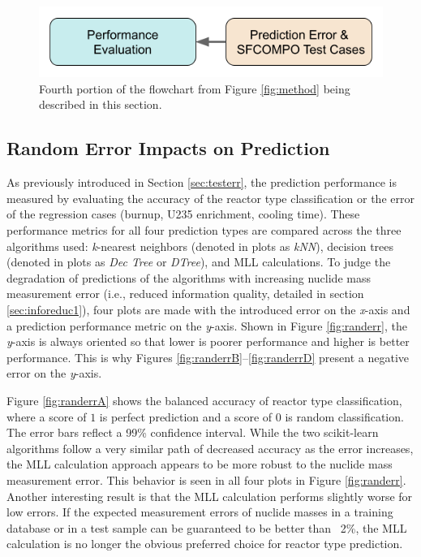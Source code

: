 
\begin{figure}[H]
  \centering
  \includegraphics[width=0.7\linewidth]{./chapters/exp1/methodology4.png}
  \caption{Fourth portion of the flowchart from Figure \ref{fig:method} being 
           described in this section.}
\end{figure}

\subsection{Random Error Impacts on Prediction}
\label{sec:randerr}
As previously introduced in Section \ref{sec:testerr}, the prediction
performance is measured by evaluating the accuracy of the reactor type
classification or the error of the regression cases (burnup, \gls{U235}
enrichment, cooling time).  These performance metrics for all four prediction
types are compared across the three algorithms used: \textit{k}-nearest
neighbors (denoted in plots as \textit{kNN}), decision trees (denoted in plots
as \textit{Dec Tree} or \textit{DTree}), and \gls{MLL} calculations.  To judge
the degradation of predictions of the algorithms with increasing nuclide mass
measurement error (i.e., reduced information quality, detailed in section
\ref{sec:inforeduc1}), four plots are made with the introduced error on the
\textit{x}-axis and a prediction performance metric on the \textit{y}-axis.
Shown in Figure \ref{fig:randerr}, the \textit{y}-axis is always oriented so
that lower is poorer performance and higher is better performance. This is why
Figures \ref{fig:randerrB}--\ref{fig:randerrD} present a negative error on the
\textit{y}-axis.

Figure \ref{fig:randerrA} shows the balanced accuracy of reactor type
classification, where a score of $1$ is perfect prediction and a score of $0$
is random classification. The error bars reflect a 99\% confidence interval.
While the two scikit-learn algorithms follow a very similar path of decreased
accuracy as the error increases, the \gls{MLL} calculation approach appears to
be more robust to the nuclide mass measurement error. This behavior is seen in
all four plots in Figure \ref{fig:randerr}. Another interesting result is that
the \gls{MLL} calculation performs slightly worse for low errors. If the
expected measurement errors of nuclide masses in a training database or in a
test sample can be guaranteed to be better than ~2\%, the \gls{MLL} calculation
is no longer the obvious preferred choice for reactor type prediction.

